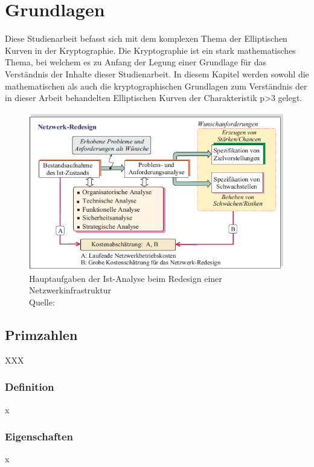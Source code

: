 \chapter{Grundlagen}
Diese Studienarbeit befasst sich mit dem komplexen Thema der Elliptischen Kurven in der Kryptographie. Die Kryptographie ist ein stark mathematisches Thema, bei welchem es zu Anfang der Legung einer Grundlage für das Verständnis der Inhalte dieser Studienarbeit. In diesem Kapitel werden sowohl die mathematischen als auch die kryptographischen Grundlagen zum Verständnis der in dieser Arbeit behandelten Elliptischen Kurven der Charakteristik p>3 gelegt. 

\begin{figure}[!h]
\centering
\includegraphics[width=\textwidth]{grafiken/aufgaben_redesign.png}
\caption[Hauptaufgaben der Ist-Analyse beim Redesign einer Netzwerkinfrastruktur]{Hauptaufgaben der Ist-Analyse beim Redesign einer Netzwerkinfrastruktur \\ Quelle: \cite{Berghammer.2021}}
\label{fig:aufgaben_redesign}
\end{figure}

\section{Primzahlen}
XXX

\subsection{Definition}
x

\subsection{Eigenschaften}
x

